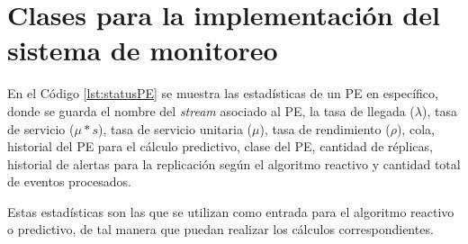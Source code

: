 \chapter{Clases para la implementaci\'on del sistema de monitoreo}
\label{apendice:clases}

En el C\'odigo \ref{lst:statusPE} se muestra las estad\'isticas de un PE en espec\'ifico, donde se guarda el nombre del \textit{stream} asociado al PE, la tasa de llegada ($\lambda$), tasa de servicio ($\mu * s$), tasa de servicio unitaria ($\mu$), tasa de rendimiento ($\rho$), cola, historial del PE para el c\'alculo predictivo, clase del PE, cantidad de r\'eplicas, historial de alertas para la replicaci\'on seg\'un el algoritmo reactivo y cantidad total de eventos procesados.

Estas estad\'isticas son las que se utilizan como entrada para el algoritmo reactivo o predictivo, de tal manera que puedan realizar los c\'alculos correspondientes.

